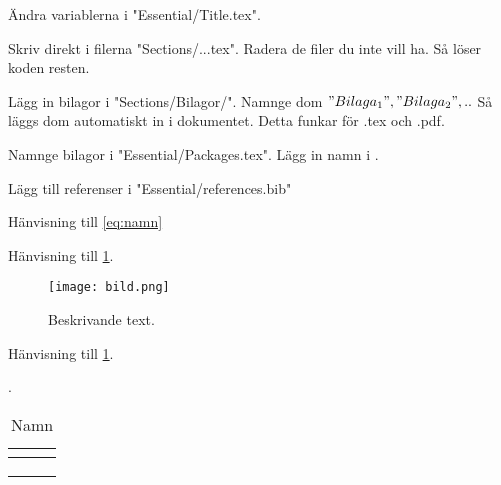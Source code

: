 
Ändra variablerna i "Essential/Title.tex".

Skriv direkt i filerna "Sections/...tex".
Radera de filer du inte vill ha. Så löser koden resten.

Lägg in bilagor i "Sections/Bilagor/".
Namnge dom $ "Bilaga_1", "Bilaga_2",.. $ Så läggs dom automatiskt in i dokumentet.
Detta funkar för .tex och .pdf.

Namnge bilagor i "Essential/Packages.tex".
Lägg in namn i \edef\bilaganamn{{"namn 1","namn 2",""}}. 

Lägg till referenser i "Essential/references.bib"





Hänvisning till \cref{eq:namn}
\begin{equation} \label{eq:namn}
\end{equation}


Hänvisning till \cref{fig:namn}.
\begin{figure} [H]
    \centering 
    \texttt{[image: bild.png]}
    \caption{Beskrivande text.}
    \label{fig:namn}
\end{figure}


Hänvisning till \cref{tab:namn}.
\begin{table}[H]
\caption{Namn} \label{tab:namn}.
\centering 
    \begin{tabular}{|c|c|c|}
    \hline
    \textbf{} & \textbf{} & \textbf{} \\
     \hline
 &  &  \\
    \hline
 &  &  \\
    \hline
 &  &  \\
    \hline
    \end{tabular} 
\end{table}